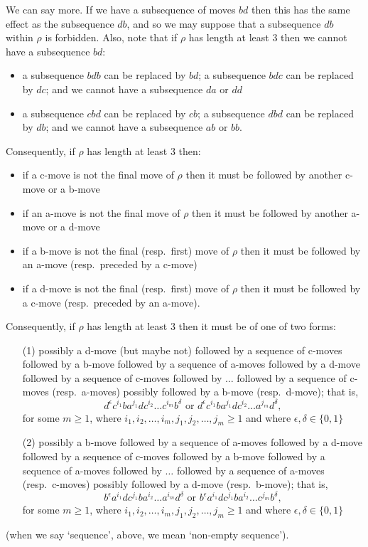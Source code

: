 \documentclass{article}
\begin{document}
We can say more. If we have a subsequence of moves $bd$ then this has the same effect as the subsequence $db$, and so we may suppose that a subsequence $db$ within $\rho$ is forbidden. Also, note that if $\rho$ has length at least $3$ then we cannot have a subsequence $bd$: 
\begin{itemize}
\item a subsequence $bdb$ can be replaced by $bd$; a subsequence $bdc$ can be replaced by $dc$; and we cannot have a subsequence $da$ or $dd$
\item a subsequence $cbd$ can be replaced by $cb$; a subsequence $dbd$ can be replaced by $db$; and we cannot have a subsequence $ab$ or $bb$.
\end{itemize}
Consequently, if $\rho$ has length at least $3$ then:
\begin{itemize}
\item if a c-move is not the final move of $\rho$ then it must be followed by another c-move or a b-move
\item if an a-move is not the final move of $\rho$ then it must be followed by another a-move or a d-move
\item if a b-move is not the final (resp.\ first) move of $\rho$ then it must be followed by an a-move (resp.\ preceded by a c-move)
\item if a d-move is not the final (resp.\ first) move of $\rho$ then it must be followed by a c-move (resp.\ preceded by an a-move).
\end{itemize}
Consequently, if $\rho$ has length at least $3$ then it must be of one of two forms: \begin{itemize}
\item[(1)] possibly a d-move (but maybe not) followed by a sequence of c-moves followed by a b-move followed by a sequence of a-moves followed by a d-move followed by a sequence of c-moves followed by $\dots$ followed by a sequence of c-moves (resp.\ a-moves) possibly followed by a b-move (resp.\ d-move); that is, $$d^\epsilon c^{i_1}ba^{j_1}dc^{i_2}\ldots c^{i_m}b^\delta\mbox{ or }d^\epsilon c^{i_1}ba^{j_1}dc^{i_2}\ldots a^{j_m}d^\delta,$$ for some $m\geq 1$, where $i_1,i_2,\ldots,i_m,j_1,j_2,\ldots,j_m \geq 1$ and where $\epsilon,\delta\in\{0,1\}$
\item[(2)] possibly a b-move followed by a sequence of a-moves followed by a d-move followed by a sequence of c-moves followed by a b-move followed by a sequence of a-moves followed by $\dots$ followed by a sequence of a-moves (resp.\ c-moves) possibly followed by a d-move (resp.\ b-move); that is, $$b^\epsilon a^{i_1}dc^{j_1}ba^{i_2}\ldots a^{i_m}d^\delta\mbox{ or }b^\epsilon a^{i_1}dc^{j_1}ba^{i_2}\ldots c^{j_m}b^\delta,$$ for some $m\geq 1$, where $i_1,i_2,\ldots,i_m,j_1,j_2,\ldots,j_m \geq 1$ and where $\epsilon,\delta\in\{0,1\}$
\end{itemize}
(when we say `sequence', above, we mean `non-empty sequence').
\end{document}
